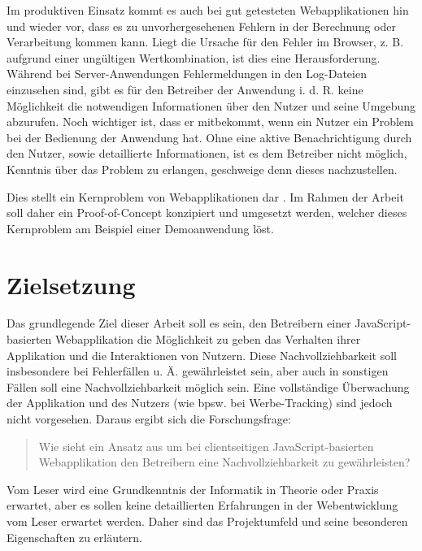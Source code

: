 Im produktiven Einsatz kommt es auch bei gut getesteten Webapplikationen hin und wieder vor, dass es zu unvorhergesehenen Fehlern in der Berechnung oder Verarbeitung kommen kann. Liegt die Ursache für den Fehler im Browser, z. B. aufgrund einer ungültigen Wertkombination, ist dies eine Herausforderung. Während bei Server-Anwendungen Fehlermeldungen in den Log-Dateien einzusehen sind, gibt es für den Betreiber der Anwendung i. d. R. keine Möglichkeit die notwendigen Informationen über den Nutzer und seine Umgebung abzurufen. Noch wichtiger ist, dass er mitbekommt, wenn ein Nutzer ein Problem bei der Bedienung der Anwendung hat. Ohne eine aktive Benachrichtigung durch den Nutzer, sowie detaillierte Informationen, ist es dem Betreiber nicht möglich, Kenntnis über das Problem zu erlangen, geschweige denn dieses nachzustellen.

Dies stellt ein Kernproblem von  Webapplikationen dar \cite{ClientSideMonitoringOfDistributedSystems}. Im Rahmen der Arbeit soll daher ein Proof-of-Concept konzipiert und umgesetzt werden, welcher dieses Kernproblem am Beispiel einer Demoanwendung löst.

\section{Zielsetzung}

Das grundlegende Ziel dieser Arbeit soll es sein, den Betreibern einer JavaScript-basierten Webapplikation die Möglichkeit zu geben das Verhalten ihrer Applikation und die Interaktionen von Nutzern. Diese Nachvollziehbarkeit soll insbesondere bei Fehlerfällen u. Ä. gewährleistet sein, aber auch in sonstigen Fällen soll eine Nachvollziehbarkeit möglich sein. Eine vollständige Überwachung der Applikation und des Nutzers (wie bpsw. bei Werbe-Tracking) sind jedoch nicht vorgesehen. Daraus ergibt sich die Forschungsfrage:

\begin{quotation}
	Wie sieht ein Ansatz aus um bei clientseitigen JavaScript-basierten Webapplikation den Betreibern eine Nachvollziehbarkeit zu gewährleisten?
\end{quotation}

Vom Leser wird eine Grundkenntnis der Informatik in Theorie oder Praxis erwartet, aber es sollen keine detaillierten Erfahrungen in der Webentwicklung vom Leser erwartet werden. Daher sind das Projektumfeld und seine besonderen Eigenschaften zu erläutern.

